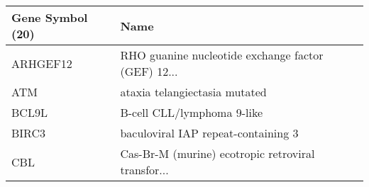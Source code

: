 \begin{tabular}{ll}
\toprule
Gene Symbol (20) &                                               Name \\
\midrule
        ARHGEF12 & RHO guanine nucleotide exchange factor (GEF) 12... \\
             ATM &                      ataxia telangiectasia mutated \\
           BCL9L &                         B-cell CLL/lymphoma 9-like \\
           BIRC3 &                baculoviral IAP repeat-containing 3 \\
             CBL & Cas-Br-M (murine) ecotropic retroviral transfor... \\
\bottomrule
\end{tabular}
